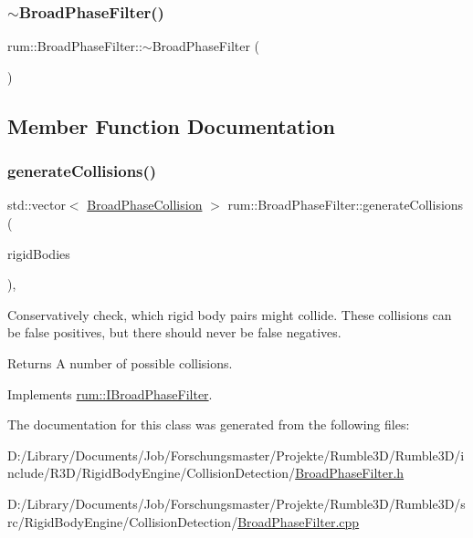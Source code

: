 \subsubsection{\texorpdfstring{$\sim$\+Broad\+Phase\+Filter()}{~BroadPhaseFilter()}}
{\footnotesize\ttfamily rum\+::\+Broad\+Phase\+Filter\+::$\sim$\+Broad\+Phase\+Filter (\begin{DoxyParamCaption}{ }\end{DoxyParamCaption})\hspace{0.3cm}{\ttfamily [default]}}



\subsection{Member Function Documentation}
\mbox{\label{classrum_1_1_broad_phase_filter_a093dbf88b707226854b0042d60a1b128}} 
\subsubsection{\texorpdfstring{generate\+Collisions()}{generateCollisions()}}
{\footnotesize\ttfamily std\+::vector$<$ \mbox{\hyperlink{structrum_1_1_broad_phase_collision}{Broad\+Phase\+Collision}} $>$ rum\+::\+Broad\+Phase\+Filter\+::generate\+Collisions (\begin{DoxyParamCaption}\item[{const std\+::vector$<$ \mbox{\hyperlink{classrum_1_1_rigid_body}{Rigid\+Body}} $\ast$$>$ \&}]{rigid\+Bodies }\end{DoxyParamCaption})\hspace{0.3cm}{\ttfamily [override]}, {\ttfamily [virtual]}}

Conservatively check, which rigid body pairs might collide. These collisions can be false positives, but there should never be false negatives. \begin{DoxyReturn}{Returns}
A number of possible collisions. 
\end{DoxyReturn}


Implements \mbox{\hyperlink{classrum_1_1_i_broad_phase_filter_a241cca5d9043353d7fb458b65b22eec0}{rum\+::\+I\+Broad\+Phase\+Filter}}.



The documentation for this class was generated from the following files\+:\begin{DoxyCompactItemize}
\item 
D\+:/\+Library/\+Documents/\+Job/\+Forschungsmaster/\+Projekte/\+Rumble3\+D/\+Rumble3\+D/include/\+R3\+D/\+Rigid\+Body\+Engine/\+Collision\+Detection/\mbox{\hyperlink{_broad_phase_filter_8h}{Broad\+Phase\+Filter.\+h}}\item 
D\+:/\+Library/\+Documents/\+Job/\+Forschungsmaster/\+Projekte/\+Rumble3\+D/\+Rumble3\+D/src/\+Rigid\+Body\+Engine/\+Collision\+Detection/\mbox{\hyperlink{_broad_phase_filter_8cpp}{Broad\+Phase\+Filter.\+cpp}}\end{DoxyCompactItemize}

